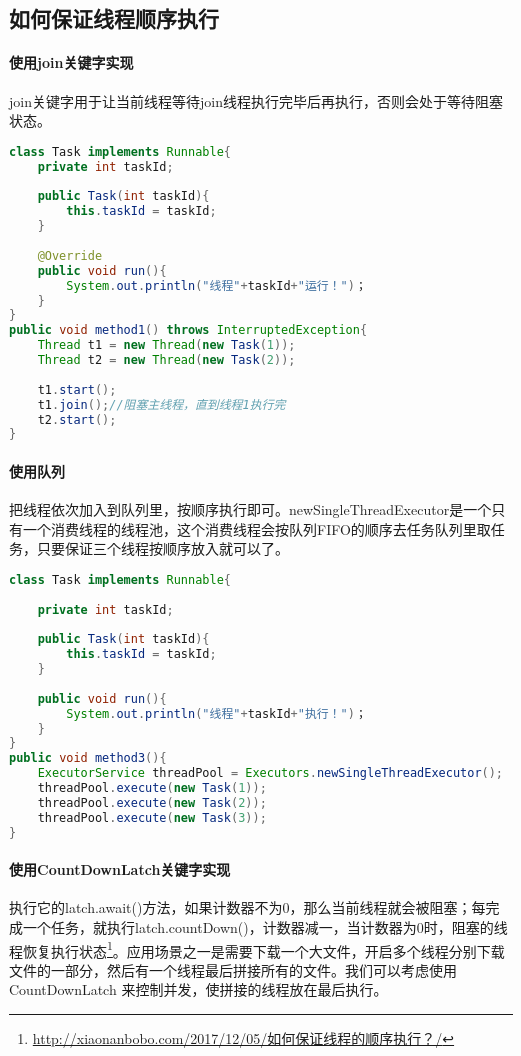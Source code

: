 \documentclass[../../../interview-questions.tex]{subfiles}
\begin{document}
\subsection{如何保证线程顺序执行}

\paragraph{使用join关键字实现}join关键字用于让当前线程等待join线程执行完毕后再执行，否则会处于等待阻塞状态。

\begin{lstlisting}[language=Java]
class Task implements Runnable{
    private int taskId;
    
    public Task(int taskId){
        this.taskId = taskId; 
    }    
    
    @Override
    public void run(){
        System.out.println("线程"+taskId+"运行！")；
    }
}
public void method1() throws InterruptedException{
    Thread t1 = new Thread(new Task(1));
    Thread t2 = new Thread(new Task(2));
    
    t1.start();
    t1.join();//阻塞主线程，直到线程1执行完
    t2.start();
}
\end{lstlisting}

\paragraph{使用队列}把线程依次加入到队列里，按顺序执行即可。newSingleThreadExecutor是一个只有一个消费线程的线程池，这个消费线程会按队列FIFO的顺序去任务队列里取任务，只要保证三个线程按顺序放入就可以了。

\begin{lstlisting}[language=Java]
class Task implements Runnable{
    
    private int taskId;
    
    public Task(int taskId){
        this.taskId = taskId;
    }
    
    public void run(){
        System.out.println("线程"+taskId+"执行！")；
    }
}
public void method3(){
    ExecutorService threadPool = Executors.newSingleThreadExecutor();
    threadPool.execute(new Task(1));
    threadPool.execute(new Task(2));
    threadPool.execute(new Task(3));
}
\end{lstlisting}

\paragraph{使用CountDownLatch关键字实现}执行它的latch.await()方法，如果计数器不为0，那么当前线程就会被阻塞；每完成一个任务，就执行latch.countDown()，计数器减一，当计数器为0时，阻塞的线程恢复执行状态\footnote{\url{http://xiaonanbobo.com/2017/12/05/如何保证线程的顺序执行？/}}。应用场景之一是需要下载一个大文件，开启多个线程分别下载文件的一部分，然后有一个线程最后拼接所有的文件。我们可以考虑使用 CountDownLatch 来控制并发，使拼接的线程放在最后执行。
\end{document}

